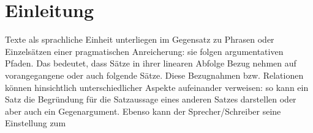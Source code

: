 \documentclass[twitterDialoge.tex]{subfiles}
\begin{document}
\section{Einleitung}
Texte als sprachliche Einheit unterliegen im Gegensatz zu Phrasen oder Einzelsätzen einer pragmatischen Anreicherung: sie folgen argumentativen Pfaden. Das bedeutet, dass Sätze in ihrer linearen Abfolge Bezug nehmen auf vorangegangene oder auch folgende Sätze. Diese Bezugnahmen bzw. Relationen können hinsichtlich unterschiedlicher Aspekte aufeinander verweisen: so kann ein Satz die Begründung für die Satzaussage eines anderen Satzes darstellen oder aber auch ein Gegenargument. Ebenso kann der Sprecher/Schreiber seine Einstellung zum 
\end{document}
